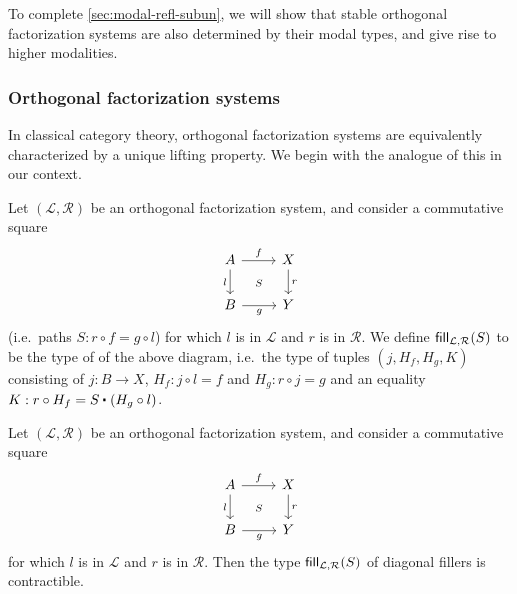 To complete \cref{sec:modal-refl-subun}, we will show that stable orthogonal factorization systems are also determined by their modal types, and give rise to higher modalities.

\subsubsection{Orthogonal factorization systems}

In classical category theory, orthogonal factorization systems are equivalently characterized by a unique lifting property.
We begin with the analogue of this in our context.

\begin{defn}
Let $(\mathcal{L},\mathcal{R})$ be an orthogonal factorization system, and
consider a commutative square
\begin{equation*}
\begin{tikzcd}
A \arrow[r,"f"] \arrow[d,swap,"l"] \ar[dr,phantom,"\scriptstyle S"] & X \arrow[d,"r"] \\
B \arrow[r,swap,"g"] & Y
\end{tikzcd}
\end{equation*}
(i.e.\ paths $S : r\circ f = g\circ l$)
for which $l$ is in $\mathcal{L}$ and $r$ is in $\mathcal{R}$. We define
$\mathsf{fill}_{\mathcal{L},\mathcal{R}}(S)$ to be the type of 
of the above diagram, i.e.~the type of tuples $(j,H_f,H_g,K)$ consisting of
$j:B\to X$, $H_f:j\circ l=f$ and $H_g:r\circ j=g$ and an equality $K : r\circ H_f = \ct S{(H_g \circ l)}$.
\end{defn}

\begin{lem}\label{lem:diagonal_fillers}
Let $(\mathcal{L},\mathcal{R})$ be an orthogonal factorization system, and
consider a commutative square
\begin{equation*}
\begin{tikzcd}
A \arrow[r,"f"] \arrow[d,swap,"l"] \ar[dr,phantom,"\scriptstyle S"] & X \arrow[d,"r"] \\
B \arrow[r,swap,"g"] & Y
\end{tikzcd}
\end{equation*}
for which $l$ is in $\mathcal{L}$ and $r$ is in $\mathcal{R}$. Then the type
$\mathsf{fill}_{\mathcal{L},\mathcal{R}}(S)$ of diagonal fillers is contractible.
\end{lem}

